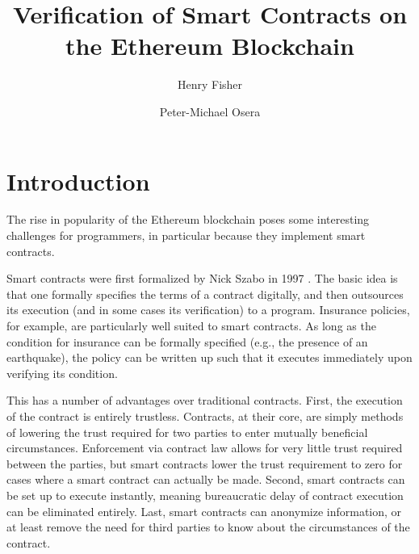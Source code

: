 \documentclass[acmsmall]{acmart}\settopmatter{}
\begin{document}
\title{Verification of Smart Contracts on the Ethereum Blockchain}
\author{Henry Fisher}

\author{Peter-Michael Osera}

\maketitle


\section{Introduction}

The rise in popularity of the Ethereum blockchain poses some interesting challenges for programmers, in particular because they implement smart contracts.

Smart contracts were first formalized by Nick Szabo in 1997 \cite{szabo}. The basic idea is that one formally specifies the terms of a contract digitally, and then outsources its execution (and in some cases its verification) to a program. Insurance policies, for example, are particularly well suited to smart contracts. As long as the condition for insurance can be formally specified (e.g., the presence of an earthquake), the policy can be written up such that it executes immediately upon verifying its condition.

This has a number of advantages over traditional contracts. First, the execution of the contract is entirely trustless. Contracts, at their core, are simply methods of lowering the trust required for two parties to enter mutually beneficial circumstances. Enforcement via contract law allows for very little trust required between the parties, but smart contracts lower the trust requirement to zero for cases where a smart contract can actually be made. Second, smart contracts can be set up to execute instantly, meaning bureaucratic delay of contract execution can be eliminated entirely. Last, smart contracts can anonymize information, or at least remove the need for third parties to know about the circumstances of the contract.
\end{document}
